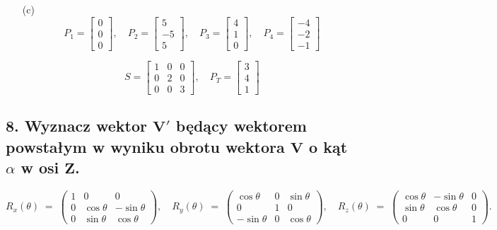 \begin{enumerate}
    \item[(c)] 
    \[
    P_1 = \begin{bmatrix} 0 \\ 0 \\ 0 \end{bmatrix}, 
    \quad P_2 = \begin{bmatrix} 5 \\ -5 \\ 5 \end{bmatrix}, 
    \quad P_3 = \begin{bmatrix} 4 \\ 1 \\ 0 \end{bmatrix}, 
    \quad P_4 = \begin{bmatrix} -4 \\ -2 \\ -1 \end{bmatrix}
    \]
    
    \[
    S = \begin{bmatrix} 1 & 0 & 0 \\ 0 & 2 & 0 \\ 0 & 0 & 3 \end{bmatrix}, 
    \quad P_T = \begin{bmatrix} 3 \\ 4 \\ 1 \end{bmatrix}
    \]
\end{enumerate}

\subsection*{8. Wyznacz wektor \( \mathbf{V'} \) będący wektorem powstałym w wyniku obrotu wektora \( \mathbf{V} \) o kąt \( \alpha \) w osi \( \mathbf{Z} \).}



\[
R_x(\theta) \;=\;
\begin{pmatrix}
1 & 0 & 0 \\
0 & \cos\theta & -\sin\theta \\
0 & \sin\theta & \cos\theta
\end{pmatrix},
\quad
R_y(\theta) \;=\;
\begin{pmatrix}
\cos\theta & 0 & \sin\theta \\
0 & 1 & 0 \\
-\sin\theta & 0 & \cos\theta
\end{pmatrix},
\quad
R_z(\theta) \;=\;
\begin{pmatrix}
\cos\theta & -\sin\theta & 0 \\
\sin\theta & \cos\theta & 0 \\
0 & 0 & 1
\end{pmatrix}.
\]

